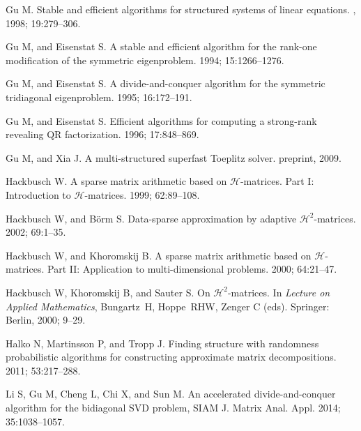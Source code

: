 \documentclass[times]{nlaauth}
\newcounter{algorithm}
\begin{document}
\begin{thebibliography}{99}
{  Gu M.}
\newblock Stable and efficient algorithms for structured systems of linear
  equations.
, 1998; 19:279--306.

{  Gu M, and Eisenstat S.}
\newblock A stable and efficient algorithm for the rank-one modification of the
  symmetric eigenproblem.
 1994;  15:1266--1276.

{  Gu M, and Eisenstat S.}
\newblock A divide-and-conquer algorithm for the symmetric tridiagonal
  eigenproblem.
 1995;  16:172--191.

{  Gu M, and Eisenstat S.}
\newblock Efficient algorithms for computing a strong-rank revealing {QR}
  factorization.
 1996; 17:848--869.

{  Gu M, and Xia J.}
\newblock A multi-structured superfast {Toeplitz} solver.
\newblock preprint, 2009.

{  Hackbusch W.}
\newblock A sparse matrix arithmetic based on $\mathcal{H}$-matrices. {Part I}:
  Introduction to $\mathcal{H}$-matrices.
 1999; 62:89--108.

{  Hackbusch W, and B\"{o}rm S.}
\newblock Data-sparse approximation by adaptive $\mathcal{H}^2$-matrices.
 2002; 69:1--35.

{  Hackbusch W, and Khoromskij B.}
\newblock A sparse matrix arithmetic based on $\mathcal{H}$-matrices. {Part
  II}: Application to multi-dimensional problems.
 2000; 64:21--47.

{  Hackbusch W, Khoromskij B, and Sauter S.}
\newblock On $\mathcal{H}^2$-matrices.
\newblock In {\em Lecture on Applied Mathematics\/},
  Bungartz~H, Hoppe~RHW, Zenger C (eds). Springer: Berlin, 2000;  9--29.



{  Halko N, Martinsson P, and Tropp J.}
\newblock Finding structure with randomness probabilistic algorithms for
  constructing approximate matrix decompositions.
 2011;  53:217--288.

{  Li S, Gu M, Cheng L, Chi X, and Sun M.}
\newblock An accelerated divide-and-conquer algorithm for the bidiagonal SVD
  problem,
\newblock SIAM J. Matrix Anal. Appl. 2014; 35:1038--1057.


\end{thebibliography}
\end{document}

